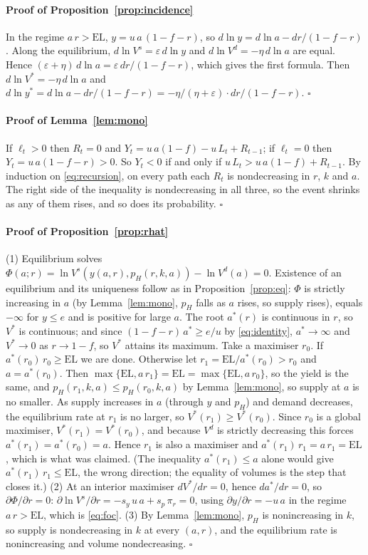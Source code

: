 \documentclass[preprint,11pt,authoryear]{elsarticle}
\theoremstyle{definition}
\newcommand{\EL}{\mathrm{EL}}
\begin{document}
\paragraph{Proof of Proposition~\ref{prop:incidence}}
In the regime $a\,r>\EL$, $y=u\,a\,(1-f-r)$, so $d\ln y=d\ln a-dr/(1-f-r)$. Along the equilibrium, $d\ln V^s=\varepsilon\,d\ln y$ and $d\ln V^d=-\eta\,d\ln a$ are equal. Hence $(\varepsilon+\eta)\,d\ln a=\varepsilon\,dr/(1-f-r)$, which gives the first formula. Then $d\ln V^*=-\eta\,d\ln a$ and $d\ln y^*=d\ln a-dr/(1-f-r)=-\eta/(\eta+\varepsilon)\cdot dr/(1-f-r)$. \hfill$\square$

\paragraph{Proof of Lemma~\ref{lem:mono}}
If $\ell_t>0$ then $R_t=0$ and $Y_t=u\,a(1-f)-u\,L_t+R_{t-1}$; if $\ell_t=0$ then $Y_t=u\,a(1-f-r)>0$. So $Y_t<0$ if and only if $u\,L_t>u\,a(1-f)+R_{t-1}$. By induction on \eqref{eq:recursion}, on every path each $R_t$ is nondecreasing in $r$, $k$ and $a$. The right side of the inequality is nondecreasing in all three, so the event shrinks as any of them rises, and so does its probability. \hfill$\square$

\paragraph{Proof of Proposition~\ref{prop:rhat}}
(1) Equilibrium solves $\Phi(a;r)=\ln V^s(y(a,r),p_H(r,k,a))-\ln V^d(a)=0$. Existence of an equilibrium and its uniqueness follow as in Proposition~\ref{prop:eq}: $\Phi$ is strictly increasing in $a$ (by Lemma~\ref{lem:mono}, $p_H$ falls as $a$ rises, so supply rises), equals $-\infty$ for $y\le e$ and is positive for large $a$. The root $a^*(r)$ is continuous in $r$, so $V^*$ is continuous; and since $(1-f-r)\,a^*\ge e/u$ by \eqref{eq:identity}, $a^*\to\infty$ and $V^*\to0$ as $r\to1-f$, so $V^*$ attains its maximum. Take a maximiser $r_0$. If $a^*(r_0)\,r_0\ge\EL$ we are done. Otherwise let $r_1=\EL/a^*(r_0)>r_0$ and $a=a^*(r_0)$. Then $\max\{\EL,a\,r_1\}=\EL=\max\{\EL,a\,r_0\}$, so the yield is the same, and $p_H(r_1,k,a)\le p_H(r_0,k,a)$ by Lemma~\ref{lem:mono}, so supply at $a$ is no smaller. As supply increases in $a$ (through $y$ and $p_H$) and demand decreases, the equilibrium rate at $r_1$ is no larger, so $V^*(r_1)\ge V^*(r_0)$. Since $r_0$ is a global maximiser, $V^*(r_1)=V^*(r_0)$, and because $V^d$ is strictly decreasing this forces $a^*(r_1)=a^*(r_0)=a$. Hence $r_1$ is also a maximiser and $a^*(r_1)\,r_1=a\,r_1=\EL$, which is what was claimed. (The inequality $a^*(r_1)\le a$ alone would give $a^*(r_1)\,r_1\le\EL$, the wrong direction; the equality of volumes is the step that closes it.)
(2) At an interior maximiser $dV^*/dr=0$, hence $da^*/dr=0$, so $\partial\Phi/\partial r=0$: $\partial\ln V^s/\partial r=-s_y\,u\,a+s_p\,\pi_r=0$, using $\partial y/\partial r=-u\,a$ in the regime $a\,r>\EL$, which is \eqref{eq:foc}.
(3) By Lemma~\ref{lem:mono}, $p_H$ is nonincreasing in $k$, so supply is nondecreasing in $k$ at every $(a,r)$, and the equilibrium rate is nonincreasing and volume nondecreasing. \hfill$\square$
\end{document}
